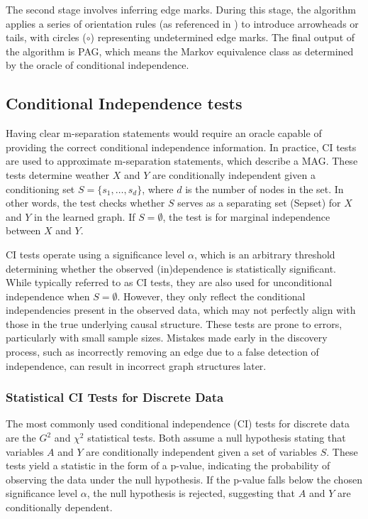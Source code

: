\documentclass[main.tex]{subfiles}
\begin{document}
The second stage involves inferring edge marks. During this stage, the algorithm applies a series of orientation rules (as referenced in \cite{ZHANG20081873}) to introduce arrowheads or tails, with circles ($\circ$) representing undetermined edge marks. The final output of the algorithm is PAG, which means the Markov equivalence class as determined by the oracle of conditional independence.

\subsection{Conditional Independence tests}
Having clear m-separation statements would require an oracle capable of providing the correct conditional independence information. In practice, CI tests are used to approximate m-separation statements, which describe a MAG. These tests determine weather \( X \) and \( Y \) are conditionally independent given a conditioning set \( S = \{s_1, \dots, s_d\} \), where \( d \) is the number of nodes in the set. In other words, the test checks whether \( S \) serves as a separating set (Sepset) for \( X \) and \( Y \) in the learned graph. If \( S = \emptyset \), the test is for marginal independence between \( X \) and \( Y \).

CI tests operate using a significance level \( \alpha \), which is an arbitrary threshold determining whether the observed (in)dependence is statistically significant. While typically referred to as CI tests, they are also used for unconditional independence when \( S = \emptyset \). However, they only reflect the conditional independencies present in the observed data, which may not perfectly align with those in the true underlying causal structure. These tests are prone to errors, particularly with small sample sizes. Mistakes made early in the discovery process, such as incorrectly removing an edge due to a false detection of independence, can result in incorrect graph structures later.

\subsubsection*{Statistical CI Tests for Discrete Data}

The most commonly used conditional independence (CI) tests for discrete data are the \( G^2 \) and \( \chi^2 \) statistical tests. Both assume a null hypothesis stating that variables \( A \) and \( Y \) are conditionally independent given a set of variables \( S \). These tests yield a statistic in the form of a p-value, indicating the probability of observing the data under the null hypothesis. If the p-value falls below the chosen significance level \( \alpha \), the null hypothesis is rejected, suggesting that \( A \) and \( Y \) are conditionally dependent.
\end{document}
